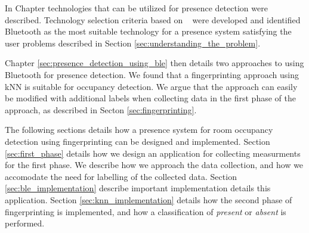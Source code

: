 In Chapter \label{sec:presence_intro} technologies that can be utilized for presence detection were described. 
Technology selection criteria based on \citeauthor{presence_ble_review}~\cite{presence_ble_review} were developed and identified Bluetooth as the most suitable technology for a presence system satisfying the user problems described in Section \ref{sec:understanding_the_problem}.

Chapter \ref{sec:presence_detection_using_ble} then details two approaches to using Bluetooth for presence detection. We found that a fingerprinting approach using kNN is suitable for occupancy detection. 
We argue that the approach can easily be modified with additional labels when collecting data in the first phase of the approach, as described in Secton \ref{sec:fingerprinting}.

The following sections details how a presence system for room occupancy detection using fingerprinting can be designed and implemented. 
Section \ref{sec:first_phase} details how we design an application for collecting measurments for the first phase. 
We describe how we approach the data collection, and how  we accomodate the need for labelling of the collected data.
Section \ref{sec:ble_implementation} describe important implementation details this application. 
Section \ref{sec:knn_implementation} details how the second phase of fingerprinting is implemented, and how a classification of \textit{present} or \textit{absent} is performed.



